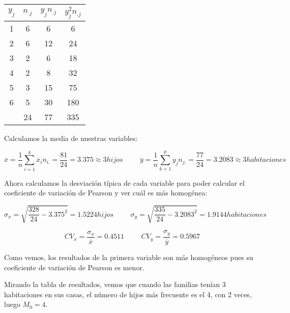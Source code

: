 \begin{table}[h]
    \centering
    \begin{tabular}{|c|c|c|c|}
        \hline
         $y_j$ & $n_{.j}$ & $y_{j}n_{.j}$ & $y_{j}^2n_{.j}$ \\ \hline
         1 & 6 & 6 & 6 \\ \hline 
         2 & 6 & 12 & 24 \\ \hline 
         3 & 2 & 6 & 18 \\ \hline 
         4 & 2 & 8 & 32 \\ \hline 
         5 & 3 & 15 & 75 \\ \hline 
         6 & 5 & 30 & 180 \\ \hline
           & 24 & 77 & 335 \\ \hline 
    \end{tabular}
\end{table}

\subproblem
Calculamos la media de nuestras variables:

\begin{equation*}
    \overline{x} = \dfrac{1}{n} \sum_{i=1}^k x_i n_{i.} = \dfrac{81}{24} = 3.375 \approx 3 hijos
    \hspace{1cm}
    \overline{y} = \dfrac{1}{n} \sum_{k=1}^p y_j n_{j.} = \dfrac{77}{24} = 3.2083 \approx 3 habitaciones
\end{equation*}

Ahora calculamos la desviación típica de cada variable para poder calcular el coeficiente de variación de Pearson y ver cuál es más homogénea:

\begin{equation*}
    \sigma_{x} = \sqrt{\dfrac{328}{24}-3.375^2} = 1.5224 hijos
    \hspace{1cm}
    \sigma_{y} = \sqrt{\dfrac{335}{24}-3.2083^2} = 1.9144 habitaciones
\end{equation*}

\begin{equation*}
    CV_{x} = \dfrac{\sigma_x}{\overline{x}} = 0.4511
    \hspace{1cm}
    CV_{y} = \dfrac{\sigma_y}{\overline{y}} = 0.5967
\end{equation*}

Como vemos, los resultados de la primera variable son más homogéneos pues su coeficiente de variación de Pearson es menor.

\subproblem
Mirando la tabla de resultados, vemos que cuando las familias tenían 3 habitaciones en sus casas, el número de hijos más frecuente es el 4, con 2 veces, luego $M_0=4$.

